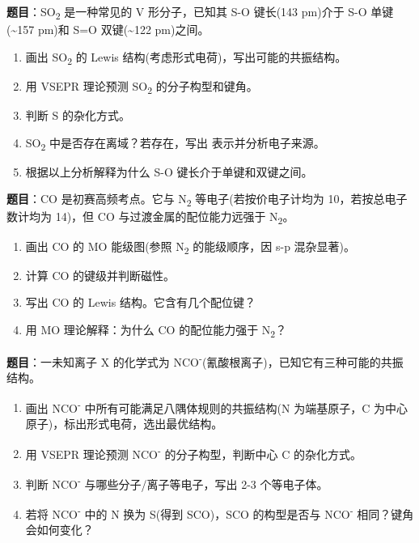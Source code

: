 \documentclass[a4paper,11pt]{ctexart}
\providecommand{\tightlist}{\setlength{\itemsep}{0pt}\setlength{\parskip}{0pt}}
\newcommand{\箭}{\ensuremath{\rightarrow}}
\newcommand{\左箭}{\ensuremath{\leftarrow}}
\newcommand{\上箭}{\ensuremath{\uparrow}}
\newcommand{\下箭}{\ensuremath{\downarrow}}
\newcommand{\衡}{\ensuremath{\rightleftharpoons}}
\newcommand{\双箭}{\ensuremath{\leftrightarrow}}
\newcommand{\约等于}{\ensuremath{\approx}}
\newcommand{\小于等于}{\ensuremath{\leq}}
\newcommand{\大于等于}{\ensuremath{\geq}}
\newcommand{\不等于}{\ensuremath{\neq}}
\newcommand{\西格马}{\ensuremath{\sigma}}
\newcommand{\派}{\ensuremath{\pi}}
\begin{document}
\textbf{题目}：SO\textsubscript{2} 是一种常见的 V 形分子，已知其 S-O 键长(143 pm)介于 S-O 单键(\textasciitilde157 pm)和 S=O 双键(\textasciitilde122 pm)之间。

\begin{enumerate}
\def\labelenumi{(\arabic{enumi})}
\tightlist
\item
  画出 SO\textsubscript{2} 的 Lewis 结构(考虑形式电荷)，写出可能的共振结构。
\item
  用 VSEPR 理论预测 SO\textsubscript{2} 的分子构型和键角。
\item
  判断 S 的杂化方式。
\item
  SO\textsubscript{2} 中是否存在离域？若存在，写出  表示并分析电子来源。
\item
  根据以上分析解释为什么 S-O 键长介于单键和双键之间。
\end{enumerate}

\textbf{题目}：CO 是初赛高频考点。它与 N\textsubscript{2} 等电子(若按价电子计均为 10，若按总电子数计均为 14)，但 CO 与过渡金属的配位能力远强于 N\textsubscript{2}。

\begin{enumerate}
\def\labelenumi{(\arabic{enumi})}
\tightlist
\item
  画出 CO 的 MO 能级图(参照 N\textsubscript{2} 的能级顺序，因 s-p 混杂显著)。
\item
  计算 CO 的键级并判断磁性。
\item
  写出 CO 的 Lewis 结构。它含有几个配位键？
\item
  用 MO 理论解释：为什么 CO 的配位能力强于 N\textsubscript{2}？
\end{enumerate}

\textbf{题目}：一未知离子 X 的化学式为 NCO\textsuperscript{-}(氰酸根离子)，已知它有三种可能的共振结构。

\begin{enumerate}
\def\labelenumi{(\arabic{enumi})}
\tightlist
\item
  画出 NCO\textsuperscript{-} 中所有可能满足八隅体规则的共振结构(N 为端基原子，C 为中心原子)，标出形式电荷，选出最优结构。
\item
  用 VSEPR 理论预测 NCO\textsuperscript{-} 的分子构型，判断中心 C 的杂化方式。
\item
  判断 NCO\textsuperscript{-} 与哪些分子/离子等电子，写出 2-3 个等电子体。
\item
  若将 NCO\textsuperscript{-} 中的 N 换为 S(得到 SCO)，SCO 的构型是否与 NCO\textsuperscript{-} 相同？键角会如何变化？
\end{enumerate}
\end{document}
